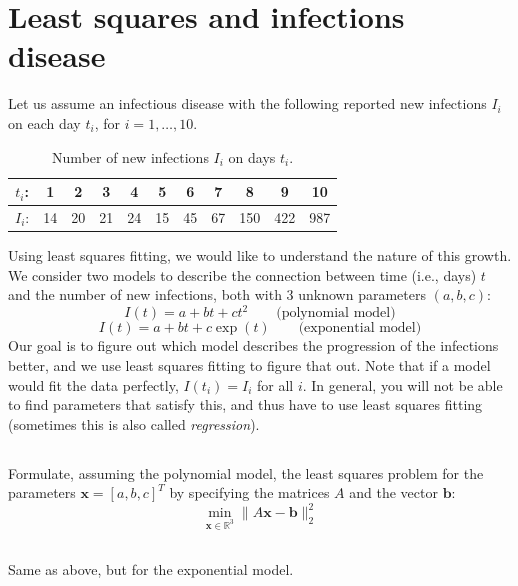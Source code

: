 \documentclass[11pt,letterpaper]{report}
\begin{document}
\section{Least squares and infections disease}
Let us assume an infectious disease with the following reported new
infections $I_i$ on each day $t_i$, for $i=1,\ldots,10$.
\begin{table}[h]\centering
  \caption{Number of new infections $I_i$ on days $t_i$.}
  \begin{tabular}{c||c|c|c|c|c|c|c|c|c|c|}
\hline
$t_i$: & 1 & 2 & 3 & 4 & 5 & 6 & 7 & 8 & 9 & 10\\ \hline
$I_i$: & 14 & 20 & 21 & 24 & 15 & 45 & 67 & 150 & 422 & 987\\ \hline
\end{tabular}
\end{table}
Using least squares fitting, we would like to understand the nature of
this growth. We consider two models to describe the connection between
time (i.e., days) $t$ and the number of new infections, both with 3
unknown parameters $(a,b,c)$:
\begin{equation*}%
  I(t) = a + b t + c t^2 \qquad \text{(polynomial model)}
\end{equation*}
\begin{equation*}%
  I(t) = a + bt + c\exp(t) \qquad \text{(exponential model)}
\end{equation*}
Our goal is to figure out which model describes the progression of the
infections better, and we use least squares fitting to figure that
out. Note that if a model would fit the data perfectly, $I(t_i) = I_i$
for all $i$. In general, you will not be able to find parameters that
satisfy this, and thus have to use least squares fitting (sometimes
this is also called \emph{regression}).

\subsection{} Formulate, assuming the polynomial model, the least squares
  problem for the parameters $\boldsymbol x=[a,b,c]^T$ by specifying the
  matrices $A$ and the vector $\boldsymbol b$:
  $$ \min_{\boldsymbol x\in \mathbb R^3}\|A\boldsymbol x - \boldsymbol
  b \|_2^2
  $$

\subsection{}  Same as above, but for the exponential model.
\end{document}
